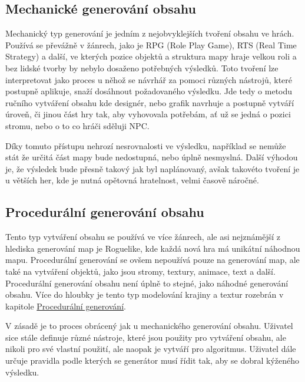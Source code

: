 \subsection{Mechanické generování obsahu}
\label{traditional}
Mechanický typ generování je jedním z nejobvyklejších tvoření obsahu ve hrách. Používá se převážně v žánrech, jako je RPG (Role Play Game), RTS (Real Time Strategy) a další, ve kterých pozice objektů a struktura mapy hraje velkou roli a bez lidské tvorby by nebylo dosaženo potřebných výsledků. Toto tvoření lze interpretovat jako proces u něhož se návrhář za pomoci různých nástrojů, které postupně aplikuje, snaží dosáhnout požadovaného výsledku. Jde tedy o metodu ručního vytváření obsahu kde designér, nebo grafik navrhuje a postupně vytváří úroveň, či jinou část hry tak, aby vyhovovala potřebám, ať už se jedná o pozici stromu, nebo o to co hráči sděluji NPC.

Díky tomuto přístupu nehrozí nesrovnalosti ve výsledku, například se nemůže stát že určitá část mapy bude nedostupná, nebo úplně nesmyslná. Další výhodou je, že výsledek bude přesně takový jak byl naplánovaný, avšak takovéto tvoření je u větších her, kde je nutná opětovná hratelnost, velmi časově náročné.

\subsection{Procedurální generování obsahu}
Tento typ vytváření obsahu se používá ve více žánrech, ale asi nejznámější z hlediska generování map je Roguelike, kde každá nová hra má unikátní náhodnou mapu. Procedurální generování se ovšem nepoužívá pouze na generování map, ale také na vytváření objektů, jako jsou stromy, textury, animace, text a další. Procedurální generování obsahu není úplně to stejné, jako náhodné generování obsahu. Více do hloubky je tento typ modelování krajiny a textur rozebrán v kapitole \hyperref[procedural]{Procedurální generování}.

V zásadě je to proces obrácený jak u mechanického generování obsahu. Uživatel sice stále definuje různé nástroje, které jsou použity pro vytváření obsahu, ale nikoli pro své vlastní použití, ale naopak je vytváří pro algoritmus. Uživatel dále určuje pravidla podle kterých se generátor musí řídit tak, aby se dobral kýženého výsledku.

